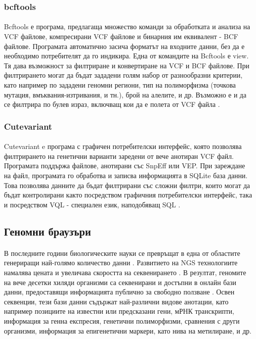 \documentclass[pdftex,cyrillic,14pt,a4page,twoside,openright]{extreport}
\begin{document}
\subsubsection{bcftools}
\paragraph{}
Bcftools е програма, предлагаща множество команди за обработката и анализа на VCF файлове, компресирани VCF файлове и бинарния им еквивалент - BCF файлове. Програмата автоматично засича форматът на входните данни, без да е необходимо потребителят да го индикира. Една от командите на Bcftools е view. Тя дава възможност за филтриране и конвертиране на VCF и BCF файлове. При филтрирането могат да бъдат зададени голям набор от разнообразни критерии, като например по зададени геномни региони, тип на полиморфизма (точкова мутация, вмъквания-изтривания, и тн.), брой на алелите, и др. Възможно е и да се филтрира по булев израз, включващ кои да е полета от VCF файла \cite{danecek2021}.


\subsubsection{Cutevariant}
\paragraph{}
Cutevariant e програма с графичен потребителски интерфейс, която позволява филтрирането на генетични варианти заредени от вече анотиран VCF файл. Програмата поддържа файлове, анотирани със SnpEff или VEP. При зареждане на файл, програмата го обработва и записва информацията в SQLite база данни. Това позволява данните да бъдат филтрирани със сложни филтри, които могат да бъдат контролирани както посредством графичния потребителски интерфейс, така и посредством VQL - специален език, наподобяващ SQL \cite{schutz2021}.

\subsection{Геномни браузъри}
\paragraph{}
В последните години биологическите науки се превръщат в една от областите генериращи най-голямо количество данни \cite{Stephens2015}. Развитието на NGS технологиите намалява цената и увеличава скоростта на секвенирането \cite{schuster2008}. В резултат, геномите на вече десетки хиляди организми са секвенирани и достъпни в онлайн бази данни, предоставящи информацията публично за свободно ползване \cite{mukherjee2020}. Освен секвенции, тези бази данни съдържат най-различни видове анотации, като например позициите на известни или предсказани гени, мРНК транскрипти, информация за генна експресия, генетични полиморфизми, сравнения с други организми, информация за епигенетични маркери, като нива на метилиране, и др.
\end{document}
